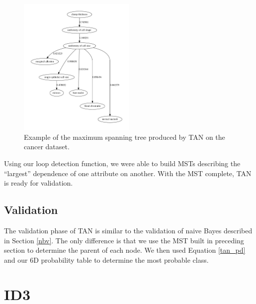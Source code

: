 \documentclass{article}
\begin{document}
		\begin{figure}
			\centering
			\includegraphics[width=0.5\textwidth]{figs/TAN/cancer}
			\caption{Example of the maximum spanning tree produced by TAN on the cancer dataset.}
		\end{figure}
		
		Using our loop detection function, we were able to build MSTs describing the ``largest'' dependence of one attribute on another. With the MST complete, TAN is ready for validation.
		
	\subsection{Validation}
		
		The validation phase of TAN is similar to the validation of naive Bayes described in Section \ref{nbv}. The only difference is that we use the MST built in preceding section to determine the parent of each node. We then used Equation \ref{tan_pd} and our 6D probability table to determine the most probable class.
		
\section{ID3}
	 
\end{document}
